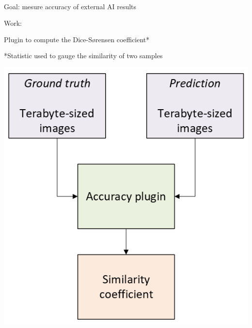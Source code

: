 \subsection{\slidetitle}
\begin{frame}
  \frametitle{\sectiontitle}
  \framesubtitle{\slidetitle}

  \begin{minipage}[h!]{0.65\textwidth}
    Goal: mesure accuracy of external AI results

    \bigskip

    Work:

    Plugin to compute the Dice-Sørensen coefficient*

    \bigskip
    \bigskip

    *Statistic used to gauge the similarity of two samples
  \end{minipage}\hfill
  \begin{minipage}[h!]{0.35\textwidth}
    \includegraphics[scale=0.55]{./img/4_accuracy.png}
  \end{minipage}
\end{frame}

\def\slidetitle{Benchmark 2D data}

